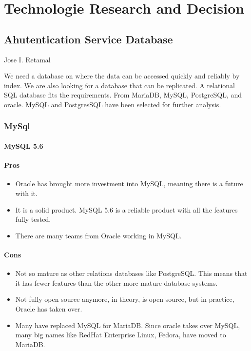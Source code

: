 \section{Technologie Research and Decision }

\subsection{Ahutentication Service Database}
Jose I. Retamal
\vskip 0.1in
\indent
\indent

We need a database on where the data can be accessed quickly and reliably by index. We are also looking for a database that can be replicated. A relational SQL database fits the requirements. From MariaDB, MySQL, PostgreSQL, and oracle. MySQL and PostgresSQL have been selected for further analysis.

\subsubsection{MySql}

\paragraph{MySQL 5.6 \cite{lbpcmysql}}  
\paragraph{Pros} 
\begin{itemize}
\item Oracle has brought more investment into MySQL, meaning there is a future with it.
 \item It is a solid product. MySQL 5.6 is a reliable product with all the features fully tested.

\item There are many teams from Oracle working in MySQL.
\end{itemize}

\paragraph{Cons}

\begin{itemize}

\item Not so mature as other relations databases like PostgreSQL. This means that it has fewer features than the other more mature database systems.
\item  Not fully open source anymore, in theory, is open source, but in practice, Oracle has taken over. 
\item Many have replaced MySQL for MariaDB. Since oracle takes over MySQL, many big names like RedHat Enterprise Linux, Fedora, have moved to MariaDB.
\end{itemize}

